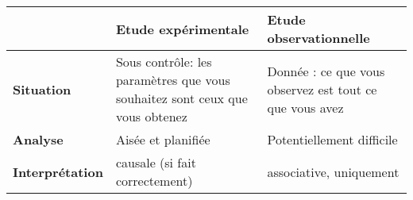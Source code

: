 \documentclass{standalone}
\begin{document}
\begin{tabular}{p{}|p{}| p{}}
	& Etude expérimentale & Etude  observationnelle \\
	\hline
	\textbf{Situation} &  \small{Sous contrôle: les paramètres que vous souhaitez sont ceux que vous obtenez} & \small{Donnée : ce que vous observez est tout ce que vous avez}\\
	\hline
	\textbf{Analyse} &  \small{Aisée et planifiée} & \small{Potentiellement difficile}\\
	\hline
	\textbf{Interprétation} &  \small{causale (si fait correctement)} & \small{associative, uniquement}\\
\end{tabular}
\end{document}
